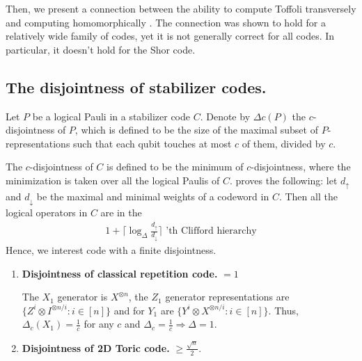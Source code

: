 \documentclass[manuscript,screen,review]{acmart}
\begin{document}
{Then, we present a connection between the ability to compute Toffoli transversely and computing homomorphically \cite{newman2017limitationstransversalcomputationquantum}. The connection was shown to hold for a relatively wide family of codes, yet it is not generally correct for all codes. In particular, it doesn't hold for the Shor code.
  \subsection{The disjointness of stabilizer codes.} 

   
\newcommand{\Disc}{ \frac{ \frac{1}{2} \Delta^{2} }{\frac{1}{2} \Delta^{2} - 1  } } 

\begin{definition}
Let $P$ be a logical Pauli in a stabilizer code $C$. Denote by $\Delta{c}(P)$ the $c$-disjointness of $P$, which is defined to be the size of the maximal subset of $P$-representations such that each qubit touches at most $c$ of them, divided by $c$. 


The $c$-disjointness of $C$ is defined to be the minimum of $c$-disjointness, where the minimization is taken over all the logical Paulis of $C$. \cite{Jochym_O_Connor_2018} proves the following: let $d_{\uparrow}$ and $d_{\downarrow}$ be the maximal and minimal weights of a codeword in $C$. Then all the logical operators in $C$ are in the   
\begin{equation*}
  \begin{split}
    1 + \lceil \log_{\Delta}\frac{d_{\uparrow} }{d_{\downarrow} } \rceil \text{   'th Clifford hierarchy}
  \end{split}
\end{equation*}
Hence, we interest code with a finite disjointness.  

\end{definition}

\begin{enumerate}
  \item \textbf{Disjointness of classical repetition code.} $ = 1$ 


    The $X_{1}$ generator is $X^{\otimes n}$, the $Z_{1}$ generator representations are $ \{ Z^{i} \otimes I^{\otimes n / i} : i \in [n] \} $ and for $Y_{1}$ are  $ \{ Y^{i} \otimes X^{\otimes n/i }  : i \in [n]  \}  $. Thus, $\Delta_{c}(X_{1}) = \frac{1}{c}$ for any $c$ and $\Delta_{c} = \frac{1}{c} \Rightarrow \Delta = 1$.
  \item \textbf{Disjointness of 2D Toric code.} $\ge \frac{\sqrt{n}}{2}$. 


\end{enumerate}}
\end{document}
